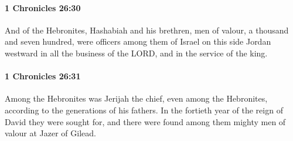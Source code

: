 		\paragraph{1 Chronicles 26:30} %
			\label{1CHRONICLES-26-30}

			And of the Hebronites, Hashabiah and his brethren, men of valour, a thousand and seven hundred, were officers among them of Israel on this side Jordan westward in all the business of the LORD, and in the service of the king.


		\paragraph{1 Chronicles 26:31} %
			\label{1CHRONICLES-26-31}

			Among the Hebronites was Jerijah the chief, even among the Hebronites, according to the generations of his fathers. In the fortieth year of the reign of David they were sought for, and there were found among them mighty men of valour at Jazer of Gilead.

